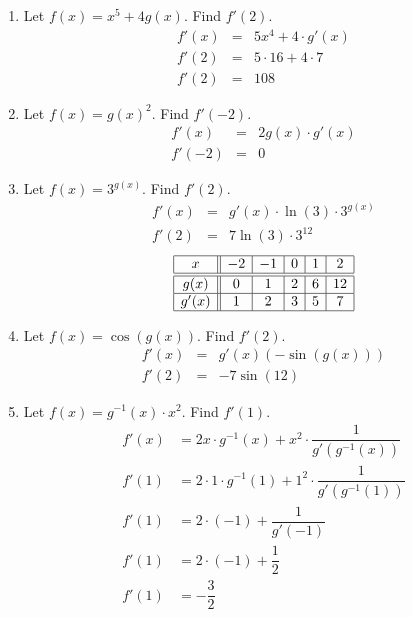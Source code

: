 \documentclass[11pt]{article}
\begin{document}
\begin{enumerate}
  \begin{enumerate}
  \item Let $f(x)=x^5+4g(x)$. Find $f'(2)$.
    \vfill
    {\color{blue}
      \[
      \begin{array}{rcl}
        f'(x)&=&5x^4+4\cdot g'(x)\\
        f'(2)&=&5\cdot 16+4\cdot 7\\
        f'(2)&=&108
      \end{array}
      \]
    }
    \vfill
  \item Let $f(x)=g(x)^2$. Find $f'(-2)$.
    \vfill
    {\color{blue}
      \[
      \begin{array}{rcl}
        f'(x)&=&2g(x)\cdot g'(x)\\
        f'(-2)&=&0
      \end{array}
      \]
    }
    \vfill
  \item Let $f(x)=3^{g(x)}$. Find $f'(2)$.
    \vfill
    {\color{blue}
      \[
      \begin{array}{rcl}
        f'(x)&=&g'(x)\cdot\ln(3)\cdot 3^{g(x)}\\
        f'(2)&=&7\ln(3)\cdot 3^{12}
      \end{array}
      \]
    }
    \vfill
    \newpage
    \[
    \begin{array}{|c||c|c|c|c|c|}
      \hline
      x&-2&-1&0&1&2\\
      \hline
      \hline
      g(x)&0&1&2&6&12\\
      \hline
      g'(x)&1&2&3&5&7\\
      \hline
    \end{array}
    \]
  \item Let $f(x)=\cos(g(x))$. Find $f'(2)$.
    \vfill
    {\color{blue}
      \[
      \begin{array}{rcl}
        f'(x)&=&g'(x)(-\sin(g(x)))\\
        f'(2)&=&-7\sin(12)
      \end{array}
      \]
    }
    \vfill
  \item Let $f(x)=g^{-1}(x)\cdot x^2$.  Find $f'(1)$.
    \vfill
    {\color{blue}
      \begin{align*}
        f'(x) & = 2x\cdot g^{-1}(x)+x^2\cdot\dfrac{1}{g'\left(g^{-1}(x)\right)}\\
        f'(1) & = 2\cdot 1\cdot g^{-1}(1)+1^2\cdot\dfrac{1}{g'\left(g^{-1}(1)\right)}\\
        f'(1) & = 2\cdot (-1)+\dfrac{1}{g'\left(-1\right)}\\
        f'(1) & = 2\cdot (-1)+\dfrac{1}{2}\\
        f'(1) & = -\dfrac{3}{2}\\
      \end{align*}
    }
    \vfill


\end{enumerate}
\end{enumerate}
\end{document}
